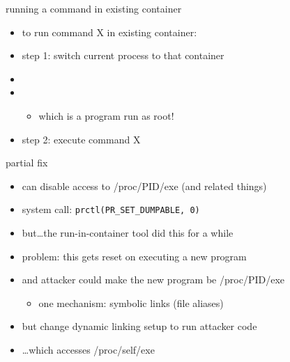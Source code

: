\begin{frame}{running a command in existing container}
    \begin{itemize}
    \item to run command X in existing container:
    \vspace{.5cm}
    \item step 1: switch current process to that container
    \item<2-> 
    \item<2-> 
        \begin{itemize}
        \item which is a program run as root!
        \end{itemize}
    \vspace{.25cm}
    \item step 2: execute command X
    \end{itemize}
\end{frame}


\begin{frame}{partial fix}
    \begin{itemize}
    \item can disable access to /proc/PID/exe (and related things)
    \item system call: \texttt{prctl(PR\_SET\_DUMPABLE, 0)}
    \item but\ldots the run-in-container tool did this for a while
    \vspace{.5cm}
    \item<2-> problem: this gets reset on executing a new program
    \item<2-> and attacker could make the new program be /proc/PID/exe
        \begin{itemize}
        \item one mechanism: symbolic links (file aliases)
        \end{itemize}
    \item<2-> but change dynamic linking setup to run attacker code
    \item<2-> \ldots which accesses /proc/self/exe
    \end{itemize}
\end{frame}


